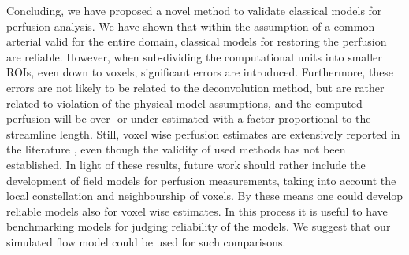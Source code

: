 \documentclass[paper=a4, fontsize=11pt,parskip=half,headings=small]{scrartcl}
\begin{document}
	Concluding, we have proposed a novel method to validate classical models for perfusion analysis. We have shown that within the assumption of a common arterial valid for the entire domain, classical models for restoring the perfusion are reliable. However, when sub-dividing the computational units into smaller ROIs, even down to voxels, significant errors are introduced. Furthermore, these errors are not likely to be related to the deconvolution method, but are rather related to violation of the physical model assumptions, and the computed perfusion will be over- or under-estimated with a factor proportional to the streamline length. Still, voxel wise perfusion estimates are extensively reported in the literature \cite{Warwick2008, Arkink2012,White2012,Feng2013,Chen2011}, even though the validity of used methods has not been established. In light of these results, future work should rather include the development of field models for perfusion measurements, taking into account the local constellation and neighbourship of voxels. By these means one could develop reliable models also for voxel wise estimates. In this process it is useful to have benchmarking models for judging reliability of the models. We suggest that our simulated flow model could be used for such comparisons.
	 
%	

	
		
	

	
\end{document}
